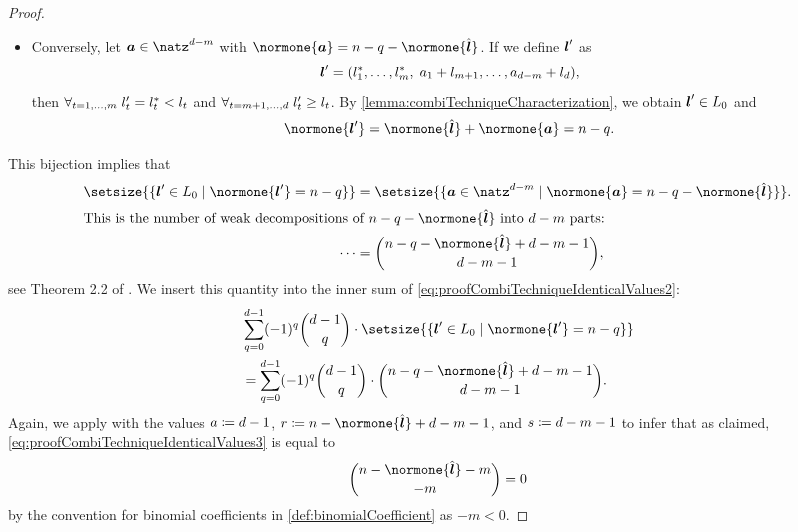 \begin{proof}
\begin{itemize}
    \item
    Conversely, let $\*a \in \natz^{d-m}$ with
    $\normone{\*a} = n - q - \normone{\hat{\*l}}$.
    If we define ${\boldsymbol{l}}'$ as
    \begin{equation}
      {\boldsymbol{l}}'
      = (l^\ast_1, \dotsc, l^\ast_m,\;
      a_1 + l_{m+1}, \dotsc, a_{d-m} + l_d),
    \end{equation}
    then $\forall_{t=1,\dotsc,m}\;l'_t = l^\ast_t < l_t$ and
    $\forall_{t=m+1,\dotsc,d}\;l'_t \ge l_t$.
    By \cref{lemma:combiTechniqueCharacterization},
    we obtain ${\boldsymbol{l}}' \in L_0$ and
    \begin{equation}
      \normone{\*l'}
      = \normone{\hat{\*l}} + \normone{\*a}
      = n - q.
    \end{equation}
  \end{itemize}
  This bijection implies that
  \begin{subequations}
    \begin{align}
      \setsize{\{\*l' \in L_0 \mid \normone{\*l'} = n - q\}}
      &= \setsize{
        \{\*a \in \natz^{d-m} \mid \normone{\*a} = n - q - \normone{\hat{\*l}}\}
      }.\\
      \intertext{%
        This is the number of weak decompositions of
        $n - q - \normone{\hat{\*l}}$ into $d - m$ parts:%
      }
      \cdots
      &= \binom{n - q - \normone{\hat{\*l}} + d - m - 1}{d - m - 1},
    \end{align}
  \end{subequations}
  see Theorem 2.2 of \cite{Bona15Introduction}.
  We insert this quantity into the inner sum of
  \eqref{eq:proofCombiTechniqueIdenticalValues2}:
  \begin{subequations}
    \label{eq:proofCombiTechniqueIdenticalValues3}
    \begin{align}
      &\sum_{q=0}^{d-1}
      (-1)^q \binom{d-1}{q} \cdot
      \setsize{\{\*l' \in L_0 \mid \normone{\*l'} = n - q\}}\\
      &= \sum_{q=0}^{d-1} (-1)^q \binom{d-1}{q} \cdot
      \binom{n - q - \normone{\hat{\*l}} + d - m - 1}{d - m - 1}.
    \end{align}
  \end{subequations}
  Again, we apply 
  with the values $a \coloneqq d - 1$,
  $r \ceq n - \normone{\hat{\*l}} + d - m - 1$, and
  $s \coloneqq d - m - 1$ to infer that as claimed,
  \eqref{eq:proofCombiTechniqueIdenticalValues3} is equal to
  \begin{equation}
  \label{eq:proofCombiTechniqueIdenticalValues4}
    \binom{n - \normone{\hat{\*l}} - m}{-m}
    = 0
  \end{equation}
  by the convention for binomial coefficients in \cref{def:binomialCoefficient}
  as $-m < 0$.
  

\end{proof}
